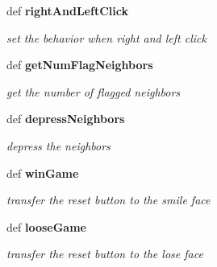 \begin{CompactItemize}
def \bf{right\-And\-Left\-Click}
\begin{CompactList}\small\item\em set the behavior when right and left click \item\end{CompactList}\item 
def \bf{get\-Num\-Flag\-Neighbors}
\begin{CompactList}\small\item\em get the number of flagged neighbors \item\end{CompactList}\item 
def \bf{depress\-Neighbors}
\begin{CompactList}\small\item\em depress the neighbors \item\end{CompactList}\item 
def \bf{win\-Game}
\begin{CompactList}\small\item\em transfer the reset button to the smile face \item\end{CompactList}\item 
def \bf{loose\-Game}
\begin{CompactList}\small\item\em transfer the reset button to the lose face \item\end{CompactList}\end{CompactItemize}
